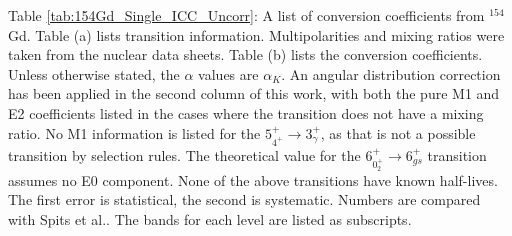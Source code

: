 \begin{landscape}
\begin{table}
\begin{ThreePartTable}
\end{ThreePartTable}
\end{table}
\begin{table}
    \begin{ThreePartTable}
        \makeatletter\def\TPT@hsize{}\makeatletter
\begin{tablenotes}
    Table \ref{tab:154Gd_Single_ICC_Uncorr}: A list of conversion coefficients from $^{154}$Gd. Table (a) lists transition information. Multipolarities and mixing ratios were taken from the nuclear data sheets\citep{reich09:_nds_154}. Table (b) lists the conversion coefficients. Unless otherwise stated, the $\alpha$ values are $\alpha_K$. An angular distribution correction has been applied in the second column of this work, with both the pure M1 and E2 coefficients listed in the cases where the transition does not have a mixing ratio. No M1 information is listed for the $5^+_{4^+}	\rightarrow	3^+_{\gamma}$, as that is not a possible transition by selection rules. The theoretical value for the $6^+_{0^+_2}	\rightarrow	6^+_{gs}$ transition assumes no E0 component. None of the above transitions have known half-lives. The first error is statistical, the second is systematic. Numbers are compared with Spits et al.\citep{spits96:_154gd}. The bands for each level are listed as subscripts.
 \end{tablenotes}
\end{ThreePartTable}
\end{table}
\end{landscape}